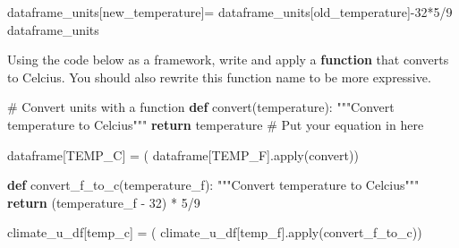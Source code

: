 \documentclass[
  letterpaper,
  DIV=11,
  numbers=noendperiod,
  oneside]{scrreprt}
\newenvironment{Shaded}{\begin{snugshade}}{\end{snugshade}}
\newcommand{\BuiltInTok}[1]{\textcolor[rgb]{0.00,0.23,0.31}{#1}}
\newcommand{\CommentTok}[1]{\textcolor[rgb]{0.37,0.37,0.37}{#1}}
\newcommand{\ControlFlowTok}[1]{\textcolor[rgb]{0.00,0.23,0.31}{\textbf{#1}}}
\newcommand{\DecValTok}[1]{\textcolor[rgb]{0.68,0.00,0.00}{#1}}
\newcommand{\KeywordTok}[1]{\textcolor[rgb]{0.00,0.23,0.31}{\textbf{#1}}}
\newcommand{\NormalTok}[1]{\textcolor[rgb]{0.00,0.23,0.31}{#1}}
\newcommand{\OperatorTok}[1]{\textcolor[rgb]{0.37,0.37,0.37}{#1}}
\newcommand{\StringTok}[1]{\textcolor[rgb]{0.13,0.47,0.30}{#1}}
\begin{document}
\begin{Shaded}
\begin{Highlighting}[]
\NormalTok{dataframe\_units[}\StringTok{\textquotesingle{}new\_temperature\textquotesingle{}}\NormalTok{]}\OperatorTok{=}\NormalTok{ dataframe\_units[}\StringTok{\textquotesingle{}old\_temperature\textquotesingle{}}\NormalTok{]}\OperatorTok{{-}}\DecValTok{32}\OperatorTok{*}\DecValTok{5}\OperatorTok{/}\DecValTok{9}
\NormalTok{dataframe\_units}
\end{Highlighting}
\end{Shaded}

\begin{tcolorbox}[enhanced jigsaw, colbacktitle=quarto-callout-color!10!white, opacityback=0, bottomtitle=1mm, toptitle=1mm, bottomrule=.15mm, left=2mm, colframe=quarto-callout-color-frame, leftrule=.75mm, opacitybacktitle=0.6, colback=white, rightrule=.15mm, toprule=.15mm, breakable, titlerule=0mm, title=\textcolor{quarto-callout-color}{\faInfo}\hspace{0.5em}{Looking for an Extra Challenge?}, coltitle=black, arc=.35mm]

Using the code below as a framework, write and apply a \textbf{function}
that converts to Celcius. You should also rewrite this function name to
be more expressive.

\end{tcolorbox}

\begin{Shaded}
\begin{Highlighting}[]
\CommentTok{\# Convert units with a function}
\KeywordTok{def}\NormalTok{ convert(temperature):}
    \CommentTok{"""Convert temperature to Celcius"""}
    \ControlFlowTok{return}\NormalTok{ temperature }\CommentTok{\# Put your equation in here}

\NormalTok{dataframe[}\StringTok{\textquotesingle{}TEMP\_C\textquotesingle{}}\NormalTok{] }\OperatorTok{=}\NormalTok{ (}
\NormalTok{    dataframe[}\StringTok{\textquotesingle{}TEMP\_F\textquotesingle{}}\NormalTok{].}\BuiltInTok{apply}\NormalTok{(convert))}
\end{Highlighting}
\end{Shaded}

\begin{Shaded}
\begin{Highlighting}[]
\KeywordTok{def}\NormalTok{ convert\_f\_to\_c(temperature\_f):}
    \CommentTok{"""Convert temperature to Celcius"""}
    \ControlFlowTok{return}\NormalTok{ (temperature\_f }\OperatorTok{{-}} \DecValTok{32}\NormalTok{) }\OperatorTok{*} \DecValTok{5}\OperatorTok{/}\DecValTok{9}

\NormalTok{climate\_u\_df[}\StringTok{\textquotesingle{}temp\_c\textquotesingle{}}\NormalTok{] }\OperatorTok{=}\NormalTok{ (}
\NormalTok{    climate\_u\_df[}\StringTok{\textquotesingle{}temp\_f\textquotesingle{}}\NormalTok{].}\BuiltInTok{apply}\NormalTok{(convert\_f\_to\_c))}
\end{Highlighting}
\end{Shaded}
\end{document}
